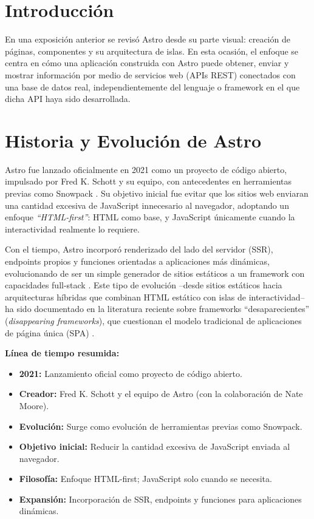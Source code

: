 \documentclass[12pt]{article}
\begin{document}
\pagestyle{plain}

\section{Introducción}

En una exposición anterior se revisó Astro desde su parte visual: creación de páginas, componentes y su arquitectura de islas. En esta ocasión, el enfoque se centra en cómo una aplicación construida con Astro puede obtener, enviar y mostrar información por medio de servicios web (APIs REST) conectados con una base de datos real, independientemente del lenguaje o framework en el que dicha API haya sido desarrollada.

\section{Historia y Evolución de Astro}

Astro fue lanzado oficialmente en 2021 como un proyecto de código abierto, impulsado por Fred K. Schott y su equipo, con antecedentes en herramientas previas como Snowpack \parencite{vepsalainen2023disappearing}. Su objetivo inicial fue evitar que los sitios web enviaran una cantidad excesiva de JavaScript innecesario al navegador, adoptando un enfoque \textit{``HTML-first''}: HTML como base, y JavaScript únicamente cuando la interactividad realmente lo requiere.

Con el tiempo, Astro incorporó renderizado del lado del servidor (SSR), endpoints propios y funciones orientadas a aplicaciones más dinámicas, evolucionando de ser un simple generador de sitios estáticos a un framework con capacidades full-stack \parencite{astro_why_docs}. Este tipo de evolución --desde sitios estáticos hacia arquitecturas híbridas que combinan HTML estático con islas de interactividad-- ha sido documentado en la literatura reciente sobre frameworks ``desaparecientes'' (\textit{disappearing frameworks}), que cuestionan el modelo tradicional de aplicaciones de página única (SPA) \parencite{vepsalainen2023rise,vepsalainen2023state}.

\textbf{Línea de tiempo resumida:}

\begin{itemize}[leftmargin=*]
  \item \textbf{2021:} Lanzamiento oficial como proyecto de código abierto.
  \item \textbf{Creador:} Fred K. Schott y el equipo de Astro (con la colaboración de Nate Moore).
  \item \textbf{Evolución:} Surge como evolución de herramientas previas como Snowpack.
  \item \textbf{Objetivo inicial:} Reducir la cantidad excesiva de JavaScript enviada al navegador.
  \item \textbf{Filosofía:} Enfoque HTML-first; JavaScript solo cuando se necesita.
  \item \textbf{Expansión:} Incorporación de SSR, endpoints y funciones para aplicaciones dinámicas.
\end{itemize}
\end{document}
